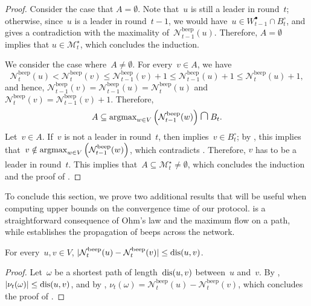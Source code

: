 \documentclass{article}
\newcommand{\lead}{\bullet}
\newcommand{\nlead}{\circ}
\newcommand{\beepcount}{\mathcal{N}^{\mathrm{beep}}}
\newcommand{\master}{\mathcal{M}^\star}
\begin{document}
\begin{proof}
    
    Consider the case that $A = \emptyset$.
    Note that~$u$ is still a leader in round~$t$; otherwise, since~$u$ is a leader in round~$t-1$, we would have~$u \in W^\lead_{t-1} \cap B^\nlead_t$, and  gives a contradiction with the maximality of~$\beepcount_{t-1}(u)$. Therefore, $A = \emptyset$ implies that $u \in \master_t$, which concludes the induction. 

    We consider the case where~$A \neq \emptyset$.
    For every~$v \in A$, we have
    \begin{equation*}
        \beepcount_{t}(u) < \beepcount_t(v) \leq \beepcount_{t-1}(v) + 1 \leq \beepcount_{t-1}(u) + 1 \leq \beepcount_{t}(u) + 1,
    \end{equation*}
    and hence, $\beepcount_{t-1}(v) = \beepcount_{t-1}(u) = \beepcount_{t}(u)$ and $\beepcount_t(v) = \beepcount_{t-1}(v) + 1$. Therefore,
    \begin{equation} \label{eq:A_property}
        A \subseteq \argmax_{w \in V} \pa{ \beepcount_{t-1}(w) } \medcap B_t.
    \end{equation}
    Let~$v \in A$. If~$v$ is not a leader in round~$t$, then  implies~$v \in B^\nlead_t$; by , this implies that~$v \notin \argmax_{w \in V} \pa{ \beepcount_{t-1}(w) }$, which contradicts . Therefore, $v$ has to be a leader in round~$t$. This implies that~$A \subseteq \master_t \neq \emptyset$, which concludes the induction and the proof of .
\end{proof}


To conclude this section, we prove two additional results that will be useful when computing upper bounds on the convergence time of our protocol.  is a straightforward consequence of Ohm's law and the maximum flow on a path, while  establishes the propagation of beeps across the network.

\begin{lemma} \label{lemma:max_beepcount_difference}
    For every~$u,v \in V$, $|\beepcount_t(u) - \beepcount_t(v)| \leq \dis(u,v)$.
\end{lemma}
\begin{proof}
    Let~$\omega$ be a shortest path of length~$\mathrm{dis}(u,v)$ between~$u$ and~$v$.
    By , $|\nu_t(\omega)| \leq \mathrm{dis}(u,v)$, and by , $\nu_t(\omega) = \beepcount_t(u) - \beepcount_t(v)$, which concludes the proof of .
\end{proof}
\end{document}
